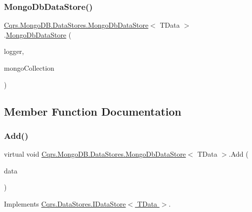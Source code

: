 \subsubsection{\texorpdfstring{Mongo\+Db\+Data\+Store()}{MongoDbDataStore()}}
{\footnotesize\ttfamily \hyperlink{classCqrs_1_1MongoDB_1_1DataStores_1_1MongoDbDataStore}{Cqrs.\+Mongo\+D\+B.\+Data\+Stores.\+Mongo\+Db\+Data\+Store}$<$ T\+Data $>$.\hyperlink{classCqrs_1_1MongoDB_1_1DataStores_1_1MongoDbDataStore}{Mongo\+Db\+Data\+Store} (\begin{DoxyParamCaption}\item[{I\+Logger}]{logger,  }\item[{I\+Mongo\+Collection$<$ T\+Data $>$}]{mongo\+Collection }\end{DoxyParamCaption})}



\subsection{Member Function Documentation}
\mbox{\label{classCqrs_1_1MongoDB_1_1DataStores_1_1MongoDbDataStore_affcb1268469b99963501dd8c58e4a480}} 
\subsubsection{\texorpdfstring{Add()}{Add()}\hspace{0.1cm}{\footnotesize\ttfamily [1/2]}}
{\footnotesize\ttfamily virtual void \hyperlink{classCqrs_1_1MongoDB_1_1DataStores_1_1MongoDbDataStore}{Cqrs.\+Mongo\+D\+B.\+Data\+Stores.\+Mongo\+Db\+Data\+Store}$<$ T\+Data $>$.Add (\begin{DoxyParamCaption}\item[{T\+Data}]{data }\end{DoxyParamCaption})\hspace{0.3cm}{\ttfamily [virtual]}}



Implements \hyperlink{interfaceCqrs_1_1DataStores_1_1IDataStore_a114404daaf37fec9cc5547cd9a17858c}{Cqrs.\+Data\+Stores.\+I\+Data\+Store$<$ T\+Data $>$}.

